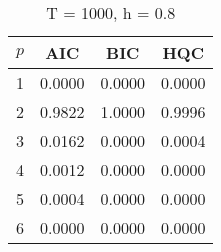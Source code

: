 \begin{table}[ht]
\captionsetup{justification=raggedright,singlelinecheck=false}
\caption*{T = 1000, h = 0.8}
\begin{tabular}{c|ccc}
  $p$ & AIC & BIC & HQC \\\hline
  1 & 0.0000 & 0.0000 & 0.0000 \\
  2 & 0.9822 & 1.0000 & 0.9996 \\
  3 & 0.0162 & 0.0000 & 0.0004 \\
  4 & 0.0012 & 0.0000 & 0.0000 \\
  5 & 0.0004 & 0.0000 & 0.0000 \\
  6 & 0.0000 & 0.0000 & 0.0000 \\
\end{tabular}
\end{table}
